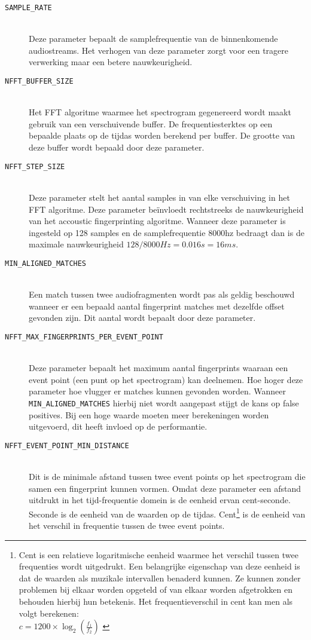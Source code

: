 \begin{description}
	\item[\texttt{SAMPLE\_RATE}] \hfill \\
		Deze parameter bepaalt de samplefrequentie van de binnenkomende audiostreams. Het verhogen van deze parameter zorgt voor een tragere verwerking maar een betere nauwkeurigheid.
	\item[\texttt{NFFT\_BUFFER\_SIZE}] \hfill \\
		Het FFT algoritme waarmee het spectrogram gegenereerd wordt maakt gebruik van een verschuivende buffer. De frequentiesterktes op een bepaalde plaats op de tijd\-as worden berekend per buffer. De grootte van deze buffer wordt bepaald door deze parameter.
	\item[\texttt{NFFT\_STEP\_SIZE}] \hfill \\
		Deze parameter stelt het aantal samples in van elke verschuiving in het FFT algoritme. Deze parameter beïnvloedt rechtstreeks de nauwkeurigheid van het accoustic fingerprinting algoritme. Wanneer deze parameter is ingesteld op 128 samples en de samplefrequentie 8000hz bedraagt dan is de maximale nauwkeurigheid $128/8000Hz = 0.016s = 16ms$.
	\item[\texttt{MIN\_ALIGNED\_MATCHES}] \hfill \\
		Een match tussen twee audiofragmenten wordt pas als geldig beschouwd wanneer er een bepaald aantal fingerprint matches met dezelfde offset gevonden zijn. Dit aantal wordt bepaalt door deze parameter.
	\item[\texttt{NFFT\_MAX\_FINGERPRINTS\_PER\_EVENT\_POINT}] \hfill \\
		Deze parameter bepaalt het maximum aantal fingerprints waaraan een event point (een punt op het spectrogram) kan deelnemen. Hoe hoger deze parameter hoe vlugger er matches kunnen gevonden worden. Wanneer \texttt{MIN\_ALIGNED\_MATCHES} hierbij niet wordt aangepast stijgt de kans op false positives. Bij een hoge waarde moeten meer berekeningen worden uitgevoerd, dit heeft invloed op de performantie.
	\item[\texttt{NFFT\_EVENT\_POINT\_MIN\_DISTANCE}] \hfill \\
		Dit is de minimale afstand tussen twee event points op het spectrogram die samen een fingerprint kunnen vormen. Omdat deze parameter een afstand uitdrukt in het tijd-frequentie domein is de eenheid ervan cent-seconde. Seconde is de eenheid van de waarden op de tijdas. Cent\footnote{Cent is een relatieve logaritmische eenheid waarmee het verschil tussen twee frequenties wordt uitgedrukt. Een belangrijke eigenschap van deze eenheid is dat de waarden als muzikale intervallen benaderd kunnen. Ze kunnen zonder problemen bij elkaar worden opgeteld of van elkaar worden afgetrokken en behouden hierbij hun betekenis. Het frequentieverschil in cent kan men als volgt berekenen:\\ \begin{math}
			c = 1200 \times \log_{2}(\frac{f_{1}}{f_{2}})
			\end{math} \cite{pitchrepresentation}} 
		is de eenheid van het verschil in frequentie tussen de twee event points. 

\end{description}

